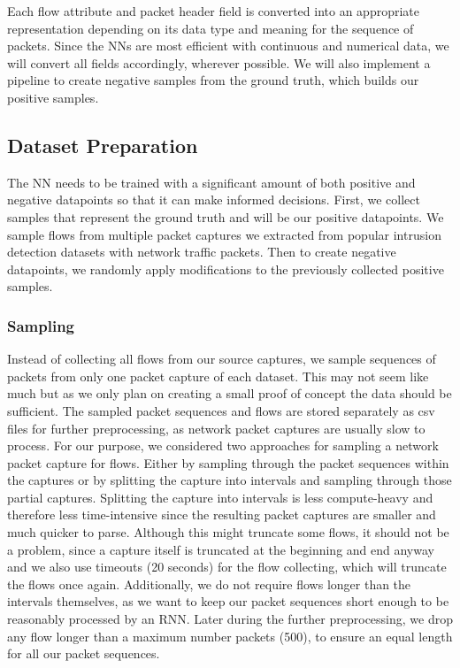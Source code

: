 \documentclass[
	ngerman,
	ruledheaders=section,%
	class=report,%
	thesis={type=bachelor},%
	accentcolor=9c,%
	custommargins=true,%
	marginpar=false,%
	parskip=half-,%
	fontsize=11pt,%
	twoside
]{tudapub}
\begin{document}
Each flow attribute and packet header field is converted into an appropriate representation depending on its data type and meaning for the sequence of packets.
Since the NNs are most efficient with continuous and numerical data, we will convert all fields accordingly, wherever possible.
We will also implement a pipeline to create negative samples from the ground truth, which builds our positive samples.

\subsection{Dataset Preparation}
\label{sec:datasetPrep}

The NN needs to be trained with a significant amount of both positive and negative datapoints so that it can make informed decisions.
First, we collect samples that represent the ground truth and will be our positive datapoints.
We sample flows from multiple packet captures we extracted from popular intrusion detection datasets with network traffic packets.
Then to create negative datapoints, we randomly apply modifications to the previously collected positive samples.

\subsubsection{Sampling}
\label{sec:sampling}

Instead of collecting all flows from our source captures, we sample sequences of packets from only one packet capture of each dataset.
This may not seem like much but as we only plan on creating a small proof of concept the data should be sufficient.
The sampled packet sequences and flows are stored separately as csv files for further preprocessing, as network packet captures are usually slow to process.
For our purpose, we considered two approaches for sampling a network packet capture for flows.
Either by sampling through the packet sequences within the captures or by splitting the capture into intervals and sampling through those partial captures.
Splitting the capture into intervals is less compute-heavy and therefore less time-intensive since the resulting packet captures are smaller and much quicker to parse.
Although this might truncate some flows, it should not be a problem, since a capture itself is truncated at the beginning and end anyway
and we also use timeouts (20 seconds) for the flow collecting, which will truncate the flows once again.
Additionally, we do not require flows longer than the intervals themselves,
as we want to keep our packet sequences short enough to be reasonably processed by an RNN.
Later during the further preprocessing, we drop any flow longer than a maximum number packets (500), to ensure an equal length for all our packet sequences.
\end{document}
